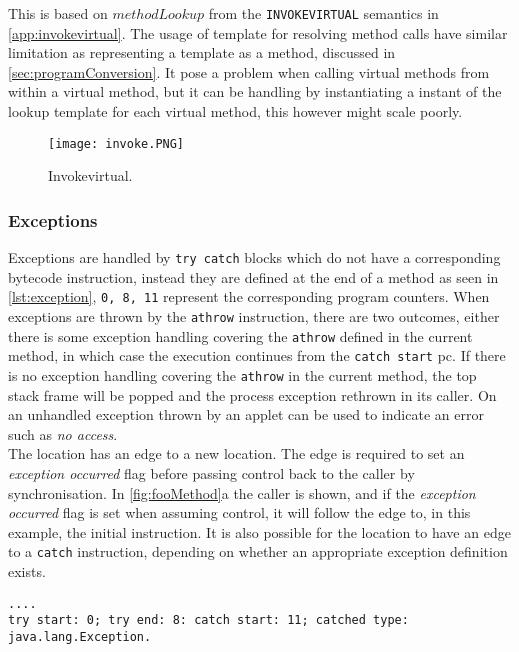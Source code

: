 \noindent This is based on $methodLookup$ from the \texttt{INVOKEVIRTUAL} semantics in \cref{app:invokevirtual}. The usage of template for resolving method calls have similar limitation as representing a template as a method, discussed in \cref{sec:programConversion}. It pose a problem when calling virtual methods from within a virtual method, but it can be handling by instantiating a instant of the lookup template for each virtual method, this however might scale poorly.

 
\begin{figure}[H]
\centering
\texttt{[image: invoke.PNG]}
\caption{Invokevirtual.}
\label{fig:invokevirtual}
\end{figure}

\subsubsection{Exceptions}
\label{sec:exceptions}
Exceptions are handled by \texttt{try catch} blocks which do not have a corresponding bytecode instruction, instead they are defined at the end of a method as seen in \cref{lst:exception}, \texttt{0, 8, 11} represent the corresponding program counters.
When exceptions are thrown by the \texttt{athrow} instruction, there are two outcomes, either there is some exception handling covering the \texttt{athrow} defined in the current method, in which case the execution continues from the \texttt{catch start} pc. 
If there is no exception handling covering the \texttt{athrow} in the current method, the top stack frame will be popped and the process exception rethrown in its caller. On \jc an unhandled exception thrown by an applet can be used to indicate an error such as \textit{no access}.\\

\noindent The  location has an edge to a new location. The edge is required to set an \textit{exception occurred} flag before passing control back to the caller by synchronisation. In \cref{fig:fooMethod}a the caller is shown, and if the \textit{exception occurred} flag is set when assuming control, it will follow the edge to, in this example, the initial instruction. It is also possible for the  location to have an edge to a \texttt{catch} instruction, depending on whether an appropriate exception definition exists.


\begin{lstlisting}[caption={Invokespecial Bytecode generated by Sawja.},numbers=none,label={lst:exception}]
....
try start: 0; try end: 8: catch start: 11; catched type: java.lang.Exception.
\end{lstlisting}






